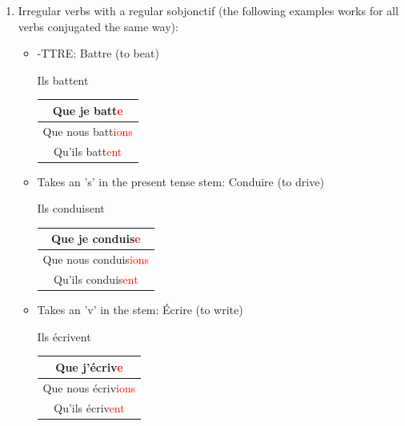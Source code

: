 \documentclass{book}
\begin{document}
\begin{enumerate}
            \item Irregular verbs with a regular sobjonctif (the following examples works for all verbs conjugated the same way):
                \begin{itemize}
                    \item -TTRE: Battre (to beat)
                    \begin{center}
                        Ils battent \\
                        \begin{tabular}{|c|}
                            \hline
                            Que je batt\textcolor{red}{e} \\
                            \hline
                            Que nous batt\textcolor{red}{ions} \\
                            \hline
                            Qu'ils batt\textcolor{red}{ent} \\
                            \hline
                        \end{tabular}
                    \end{center}

                    \item Takes an 's' in the present tense stem: Conduire (to drive)
                    \begin{center}
                        Ils conduisent \\
                        \begin{tabular}{|c|}
                            \hline
                            Que je conduis\textcolor{red}{e} \\
                            \hline
                            Que nous conduis\textcolor{red}{ions} \\
                            \hline
                            Qu'ils conduis\textcolor{red}{ent} \\
                            \hline
                        \end{tabular}
                    \end{center}

                    \item Takes an 'v' in the stem: Écrire (to write)
                    \begin{center}
                        Ils écrivent \\
                        \begin{tabular}{|c|}
                            \hline
                            Que j'écriv\textcolor{red}{e} \\
                            \hline
                            Que nous écriv\textcolor{red}{ions} \\
                            \hline
                            Qu'ils écriv\textcolor{red}{ent} \\
                            \hline
                        \end{tabular}
                    \end{center}
                \end{itemize}
            

\end{enumerate}
\end{document}
